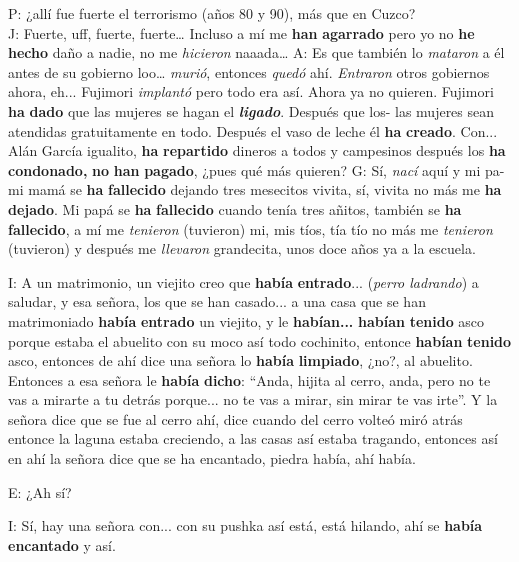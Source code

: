 \documentclass[output=paper]{../langscibook}
\begin{document}
\ea\label{ex:palacios:7}
\ea P: ¿allí fue fuerte el terrorismo (años 80 y 90), más que en Cuzco?\\
J: Fuerte, uff, fuerte, fuerte… Incluso a mí me \textbf{han} \textbf{agarrado} pero yo no \textbf{he} \textbf{hecho} daño a nadie, no me \textit{hicieron} naaada…
\ex A: Es que también lo \textit{mataron} a él antes de su gobierno loo… \textit{murió}, entonces \textit{quedó} ahí. \textit{Entraron} otros gobiernos ahora, eh... Fujimori \textit{implantó} pero todo era así. Ahora ya no quieren. Fujimori \textbf{ha} \textbf{dado} que las mujeres se hagan el \textbf{\textit{ligado}}. Después que los- las mujeres sean atendidas gratuitamente en todo. Después el vaso de leche él \textbf{ha} \textbf{creado}. Con... Alán García igualito, \textbf{ha} \textbf{repartido} dineros a todos y campesinos después los \textbf{ha} \textbf{condonado,} \textbf{no} \textbf{han} \textbf{pagado}, ¿pues qué más quieren?
\ex G: Sí, \textit{nací} aquí y mi pa- mi mamá se \textbf{ha} \textbf{fallecido} dejando tres mesecitos vivita, sí, vivita no más me \textbf{ha} \textbf{dejado}. Mi papá se \textbf{ha} \textbf{fallecido} cuando tenía tres añitos, también se \textbf{ha} \textbf{fallecido}, a mí me \textit{tenieron} (tuvieron) mi, mis tíos, tía tío no más me \textit{tenieron} (tuvieron) y después me \textit{llevaron} grandecita, unos doce años ya a la escuela.
\z
\z

\ea\label{ex:palacios:8}
I: A un matrimonio, un viejito creo que \textbf{había} \textbf{entrado}... (\textit{perro ladrando}) a saludar, y esa señora, los que se han casado... a una casa que se han matrimoniado \textbf{había} \textbf{entrado} un viejito, y le \textbf{habían...} \textbf{habían} \textbf{tenido} asco porque estaba el abuelito con su moco así todo cochinito, entonce \textbf{habían} \textbf{tenido} asco, entonces de ahí dice una señora lo \textbf{había} \textbf{limpiado}, ¿no?, al abuelito. Entonces a esa señora le \textbf{había} \textbf{dicho}: “Anda, hijita al cerro, anda, pero no te vas a mirarte a tu detrás porque... no te vas a mirar, sin mirar te vas irte”. Y la señora dice que se fue al cerro ahí, dice cuando del cerro volteó miró atrás entonce la laguna estaba creciendo, a las casas así estaba tragando, entonces así en ahí la señora dice que se ha encantado, piedra había, ahí había.


E: ¿Ah sí?

I: Sí, hay una señora con... con su pushka así está, está hilando, ahí se \textbf{había} \textbf{encantado} y así.
\z
\end{document}
